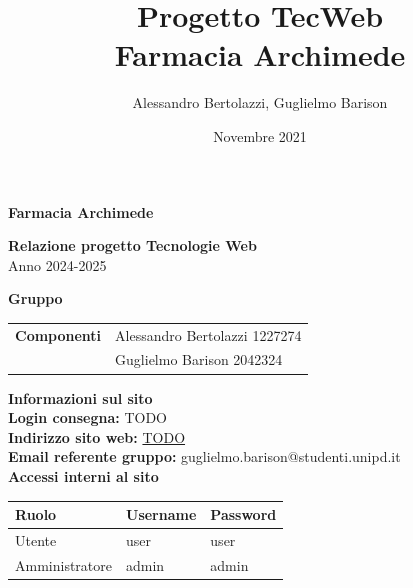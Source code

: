 \documentclass[a4paper, 11pt]{article}
\title{Progetto TecWeb \\ \large Farmacia Archimede}
\author{Alessandro Bertolazzi, Guglielmo Barison}
\date{Novembre 2021}
\begin{document}
\begin{center}
	\textbf{\Huge{Farmacia Archimede}}\\
\end{center}

\vspace{1.5cm}

\begin{center}
	\textbf{\huge{Relazione progetto Tecnologie Web}}\\[0.2cm]
	\Large{Anno 2024-2025}
\end{center}

\vspace{5pt}

\begin{center}
	\textbf{\Large{Gruppo}}
    \begin{table}[H]
        \hspace{3.5cm}
        \renewcommand{\arraystretch}{1.4}
        \begin{tabular}{l | l}
            \textbf{Componenti} & Alessandro Bertolazzi 1227274\\
            & Guglielmo Barison 2042324\\
        \end{tabular}
    \end{table}
\end{center}

\hspace{5pt}

\begin{center}
	\textbf{\Large{Informazioni sul sito}}\\
	\textbf{Login consegna:} TODO \\
	\textbf{Indirizzo sito web:} \url{TODO}\\
	\textbf{Email referente gruppo:} guglielmo.barison@studenti.unipd.it\\
    \vspace{1cm}
    \textbf{Accessi interni al sito}
    \begin{longtable}{|l|l|l|}
        \hline
        \rowcolor[HTML]{9B0014}
        {\color[HTML]{FFFFFF} Ruolo} & {\color[HTML]{FFFFFF} Username} & {\color[HTML]{FFFFFF} Password} \\ \hline
        Utente         & user     & user     \\ \hline
        Amministratore & admin    & admin \\ \hline
    \end{longtable}
\end{center}

\pagebreak
\tableofcontents
\pagebreak







\end{document}
